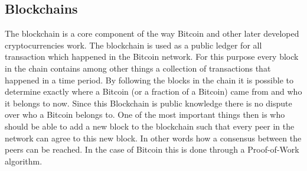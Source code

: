 \subsection{Blockchains}

The blockchain is a core component of the way Bitcoin and other later developed cryptocurrencies work. The blockchain is used as a public ledger for all transaction which happened in the Bitcoin
network. For this purpose every block in the chain contains among other things a collection of transactions that happened in a time period. By following the blocks in the chain it is possible to
determine exactly where a Bitcoin (or a fraction of a Bitcoin) came from and who it belongs to now. Since this Blockchain is public knowledge there is no dispute over who a Bitcoin belongs to.
One of the most important things then is who should be able to add a new block to the blockchain such that every peer in the network can agree to this new block. In other words how a consensus between
the peers can be reached. In the case of Bitcoin this is done through a Proof-of-Work algorithm.

